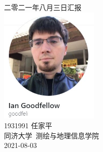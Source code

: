 \documentclass[a4paper, 12pt]{article}
\begin{document}
\begin{center}
    {\Huge 
        二零二一年八月三日汇报}\\[20pt]
    
    \includegraphics[height=15em]{pic/cover.jpg} \\[15pt] 

    {\Large 
        1931991 任家平\\[12pt]
        同济大学~测绘与地理信息学院\\[12pt]
        2021-08-03}
\end{center}
\thispagestyle{empty}



\newpage
{}
\tableofcontents
\newpage
{}




\listoffigures
{}
\listoftables
{}
\newpage
\nocite{*}

% 
\end{document}
